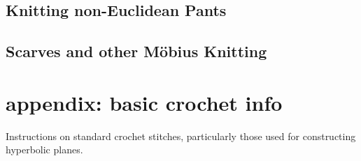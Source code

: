 \documentclass[letterpaper,titlepage]{article}
\begin{document}
\subsection{Knitting non-Euclidean Pants \cite{makingmath}}
\subsection{Scarves and other M\"obius Knitting \cite{magicalknitting}\cite{magicalknitting2}}

\section{appendix: basic crochet info}
Instructions on standard crochet stitches, particularly those used for constructing hyperbolic planes. \cite{happyhooker}

\newpage


\end{document}
